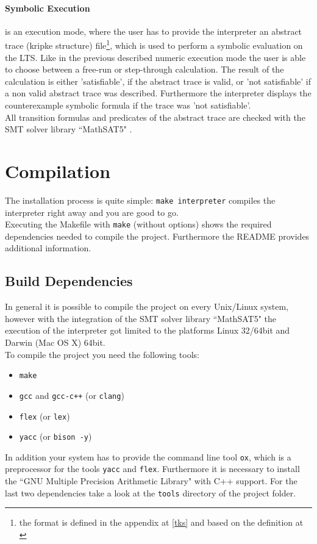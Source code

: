 \documentclass[english,a4paper,oneside]{article}%
\begin{document}
\paragraph{Symbolic Execution}
is an execution mode, where the user has to provide the interpreter an abstract trace (kripke structure) file\footnote{the format is defined in the appendix at \ref{tks} and based on the definition at \cite[p.~10]{cav}}, which is used to perform a symbolic evaluation on the LTS. Like in the previous described numeric execution mode the user is able to choose between a free-run or step-through calculation. The result of the calculation is either 'satisfiable', if the abstract trace is valid, or 'not satisfiable' if a non valid abstract trace was described. Furthermore the interpreter displays the counterexample symbolic formula if the trace was 'not satisfiable'.\\

All transition formulas and predicates of the abstract trace are checked with the SMT solver library ``MathSAT5" \cite{mathsat}.



\section{Compilation}
The installation process is quite simple: \texttt{make interpreter} compiles the interpreter right away and you are good to go. \\
Executing the Makefile with \texttt{make} (without options) shows the required dependencies needed to compile the project. Furthermore the README provides additional information.

\subsection{Build Dependencies}
In general it is possible to compile the project on every Unix/Linux system, however with the integration of the SMT solver library ``MathSAT5" \cite{mathsat} the execution of the interpreter got limited to the platforms Linux 32/64bit and Darwin (Mac OS X) 64bit.\\

To compile the project you need the following tools:
\begin{itemize}
	\item \texttt{make}
	\item \texttt{gcc} and \texttt{gcc-c++} (or \texttt{clang})
	\item \texttt{flex} (or \texttt{lex})
	\item \texttt{yacc} (or \texttt{bison -y})
\end{itemize}
In addition your system has to provide the command line tool \texttt{ox}, which is a preprocessor for the tools \texttt{yacc} and \texttt{flex}. Furthermore it is necessary to install the ``GNU Multiple Precision Arithmetic Library" with C++ support. For the last two dependencies take a look at the \texttt{tools} directory of the project folder.
\end{document}
